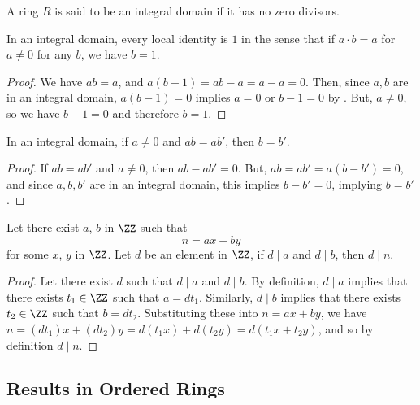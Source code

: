 \begin{definition}\label{def-int-dom}
    A ring $R$ is said to be an integral domain if it has no zero divisors.
\end{definition}

\begin{theorem}\label{local-identity-one-in-int-dom}
In an integral domain, every local identity is $1$ in the sense that if $a \cdot b = a$ for $a \neq 0$ for any $b$, we have $b=1$.
\end{theorem}
\begin{proof}
    We have $ab = a$, and $a(b-1) = ab - a = a - a = 0$. Then, since $a, b$ are in an integral domain, $a(b-1) = 0$ implies $a = 0$ or $b-1 = 0$ by . But, $a \neq 0$, so we have $b-1 = 0$ and therefore $b = 1$. 
\end{proof}

\begin{theorem}\label{mult-cancel-in-int-dom}
    In an integral domain, if $a \neq 0$ and $ab = ab'$, then $ b= b'$. 
\end{theorem}
\begin{proof}
    If $ab = ab'$ and $a \neq 0$, then $ab - ab' = 0$. But, $ab = ab' = a(b-b') = 0$, and since $a, b, b'$ are in an integral domain, this implies $b-b' = 0$, implying $b = b'$. 
\end{proof}

\begin{lemma}   \label{linearity}
    Let there exist $a$, $b$ in $\ZZ$ such that 
    \[n=ax+by\]
    for some $x$, $y$ in $\ZZ$. Let $d$ be an element in $\ZZ$, if $d \mid a$ and $d \mid b$, then $d \mid n$.
\end{lemma}
\begin{proof}
    Let there exist $d$ such that $d \mid a$ and $d \mid b$. By definition, $d \mid a$ implies that there exists $t_1 \in \ZZ$ such that $a=dt_1$. Similarly, $d \mid b$ implies that there exists $t_2 \in \ZZ$ such that $b=dt_2$. Substituting these into $n=ax+by$, we have $n=(dt_1)x+(dt_2)y = d(t_1x) + d(t_2y) = d(t_1x+t_2y)$, and so by definition $d \mid n$. 
\end{proof}



\subsection{Results in Ordered Rings}


